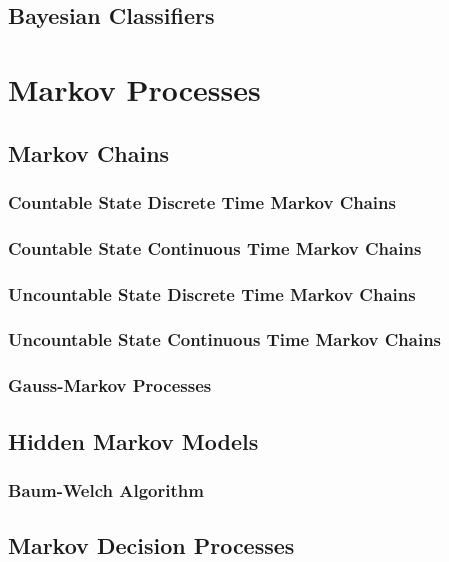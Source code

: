 \documentclass[11pt]{report} %
\begin{document}
\section{Bayesian Classifiers}

\chapter{Markov Processes}

\section{Markov Chains}

\subsection{Countable State Discrete Time Markov Chains}

\subsection{Countable State Continuous Time Markov Chains}

\subsection{Uncountable State Discrete Time Markov Chains}

\subsection{Uncountable State Continuous Time Markov Chains}

\subsection{Gauss-Markov Processes}

\section{Hidden Markov Models}

\subsection{Baum-Welch Algorithm}

\section{Markov Decision Processes}
\end{document}
